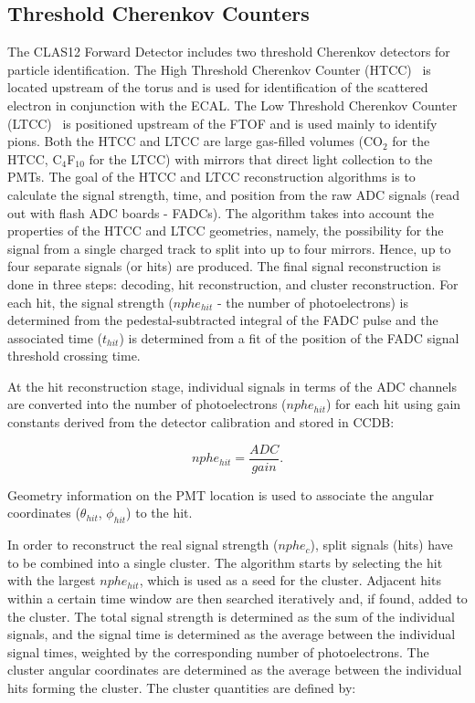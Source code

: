 \subsection{Threshold Cherenkov Counters}

The CLAS12 Forward Detector includes two threshold Cherenkov detectors for particle identification. The
High Threshold Cherenkov Counter (HTCC)~\cite{htcc-nim} is located upstream of the torus and is used for
identification of the scattered electron in conjunction with the ECAL. The Low Threshold Cherenkov Counter
(LTCC)~\cite{ltcc-nim} is positioned upstream of the FTOF and is used mainly to identify pions.
Both the HTCC and LTCC are large gas-filled volumes (CO$_2$ for the HTCC, C$_4$F$_{10}$ for the LTCC)
with mirrors that direct light collection to the PMTs. The goal of the HTCC and LTCC reconstruction algorithms
is to calculate the signal strength, time, and position from the raw ADC signals (read out with flash ADC boards
- FADCs). The algorithm takes into account the properties of the HTCC and LTCC geometries, namely, the
possibility for the signal from a single charged track to split into up to four mirrors. Hence, up to four separate
signals (or hits) are produced. The final signal reconstruction is done in three steps: decoding, hit reconstruction,
and cluster reconstruction. For each hit, the signal strength ($nphe_{hit}$ - the number of photoelectrons) is
determined from the pedestal-subtracted integral of the FADC pulse and the associated time ($t_{hit}$) is
determined from a fit of the position of the FADC signal threshold crossing time.

At the hit reconstruction stage, individual signals in terms of the ADC channels are converted into the number of
photoelectrons ($nphe_{hit}$) for each hit using gain constants derived from the detector calibration and stored
in CCDB:

\begin{equation}
nphe_{hit} = \frac{ADC}{gain}.
\end{equation}

\noindent
Geometry information on the PMT location is used to associate the angular coordinates ($\theta_{hit}$, $\phi_{hit}$)
to the hit.

In order to reconstruct the real signal strength ($nphe_c$), split signals (hits) have to be combined into a single
cluster. The algorithm starts by selecting the hit with the largest $nphe_{hit}$, which is used as a seed for the
cluster. Adjacent hits within a certain time window are then searched iteratively and, if found, added to the
cluster. The total signal strength is determined as the sum of the individual signals, and the signal time is
determined as the average between the individual signal times, weighted by the corresponding number of
photoelectrons. The cluster angular coordinates are determined as the average between the individual hits forming
the cluster. The cluster quantities are defined by:

